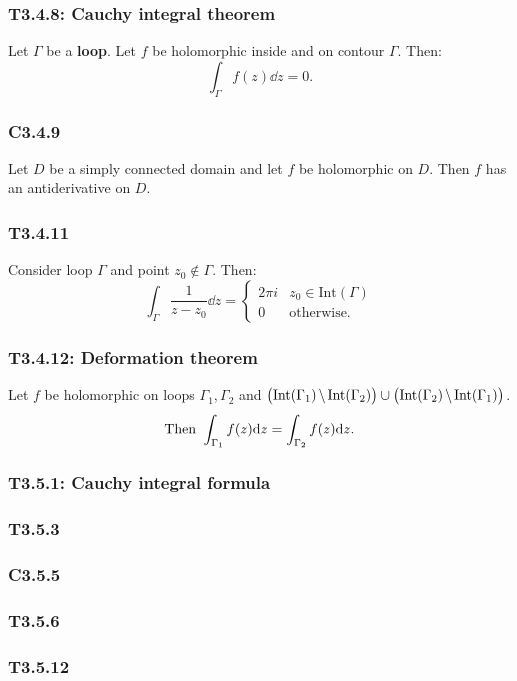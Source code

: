 \documentclass{article}
\begin{document}
\begin{multicols*}{3}
\subsubsection*{T3.4.8: Cauchy integral theorem}
Let $\Gamma$ be a \textbf{loop}. Let $f$ be holomorphic
inside and on contour $\Gamma$. Then:
$$\int_{\Gamma}f(z)\dd z=0.$$

\subsubsection*{C3.4.9}
Let $D$ be a simply connected domain and let $f$ be holomorphic on
$D$. Then $f$ has an antiderivative on $D$.

\subsubsection*{T3.4.11}
Consider loop $\Gamma$ and point $z_0\notin\Gamma$. Then:
$$\int_{\Gamma}\frac{1}{z-z_0}\dd z=\left\{\begin{array}{ll}
2\pi i & z_0\in\text{Int}(\Gamma) \\ 0 & \text{otherwise.}
\end{array}\right.$$

\subsubsection*{T3.4.12: Deformation theorem}
Let $f$ be holomorphic on loops $\Gamma_1,\Gamma_2$ and
$\bigl(\text{Int}(\Gamma_1)\hspace{0.02in}\backslash\hspace{0.02in}
\text{Int}(\Gamma_2)\bigr)\cup\bigl(\text{Int}(\Gamma_2)\hspace{0.02in}
\backslash\hspace{0.02in}\text{Int}(\Gamma_1)\bigr)$.
$$\text{Then}\hspace{0.05in}\int_{\Gamma_1}f(z)\dd z
=\int_{\Gamma_2}f(z)\dd z.$$

\subsubsection*{T3.5.1: Cauchy integral formula}

\subsubsection*{T3.5.3}

\subsubsection*{C3.5.5}

\subsubsection*{T3.5.6}

\subsubsection*{T3.5.12}

\end{multicols*}
\end{document}
